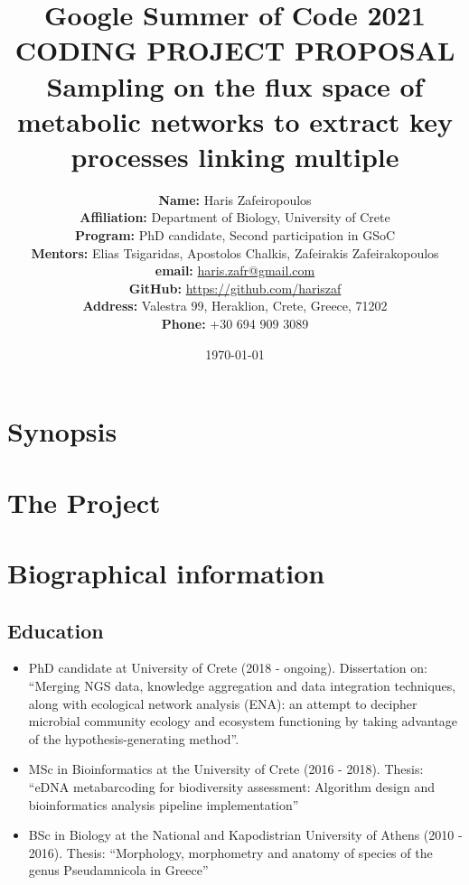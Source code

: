 \documentclass{article}
\title{Google Summer of Code 2021 \\ CODING PROJECT PROPOSAL \\ Sampling on the flux space of metabolic networks to extract key processes linking multiple }
\author{
   \textbf{Name:} {Haris Zafeiropoulos} \\
   \textbf{Affiliation:} Department of Biology, University of Crete \\
   \textbf{Program:} PhD candidate, Second participation in GSoC \\
   \textbf{Mentors:} Elias Tsigaridas, Apostolos Chalkis, Zafeirakis Zafeirakopoulos \\
   \textbf{email:} \href{mailto:haris.zafr@gmail.com}{haris.zafr@gmail.com}\\
   \textbf{GitHub:} \href{https://github.com/hariszaf}{https://github.com/hariszaf}\\
   \textbf{Address:} Valestra 99, Heraklion, Crete, Greece, 71202\\
   \textbf{Phone:} +30 694 909 3089
}
\date{\today}
\begin{document}
\maketitle
\tableofcontents



\section{Synopsis}




\section{The Project}














\section{Biographical information}
\subsection{Education}

\begin{itemize}

   \item PhD candidate at University of Crete (2018 - ongoing). Dissertation on: “Merging NGS data, knowledge aggregation and data integration techniques, along with ecological network analysis (ENA): an attempt to decipher microbial community ecology and ecosystem functioning by taking advantage of the hypothesis-generating method”.
   \item MSc in Bioinformatics at the University of Crete (2016 - 2018). Thesis: “eDNA metabarcoding for biodiversity assessment: Algorithm design and bioinformatics analysis pipeline implementation”
   \item BSc in Biology at the National and Kapodistrian University of Athens (2010 - 2016). Thesis: “Morphology, morphometry and anatomy of species of the genus Pseudamnicola in Greece” 

\end{itemize}
\end{document}
